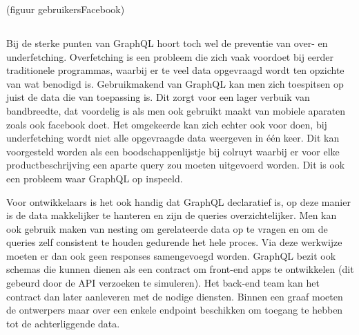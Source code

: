 (figuur gebruikersFacebook)

\subsection{}%
\label{sec:Gebruik}
Bij de sterke punten van GraphQL hoort toch wel de preventie van over- en underfetching. Overfetching is een probleem die zich vaak voordoet bij eerder traditionele programmas, waarbij er te veel data opgevraagd wordt ten opzichte van wat benodigd is. Gebruikmakend van GraphQL kan men zich toespitsen op juist de data die van toepassing is. Dit zorgt voor een lager verbuik van bandbreedte, dat voordelig is als men ook gebruikt maakt van mobiele aparaten zoals ook facebook doet. Het omgekeerde kan zich echter ook voor doen, bij underfetching wordt niet alle opgevraagde data weergeven in één keer. Dit kan voorgesteld worden als een boodschappenlijstje bij colruyt waarbij er voor elke productbeschrijving een aparte query zou moeten uitgevoerd worden. Dit is ook een probleem waar GraphQL op inspeeld.

Voor ontwikkelaars is het ook handig dat GraphQL declaratief is, op deze manier is de data makkelijker te hanteren en zijn de queries overzichtelijker. Men kan ook gebruik maken van nesting om gerelateerde data op te vragen en om de queries zelf consistent te houden gedurende het hele proces. Via deze werkwijze moeten er dan ook geen responses samengevoegd worden. GraphQL bezit ook schemas die kunnen dienen als een contract om front-end apps te ontwikkelen (dit gebeurd door de API verzoeken te simuleren). Het back-end team kan het contract dan later aanleveren met de nodige diensten. Binnen een graaf moeten de ontwerpers maar over een enkele endpoint beschikken om toegang te hebben tot de achterliggende data.

\subsection{}%
\label{sec:API}